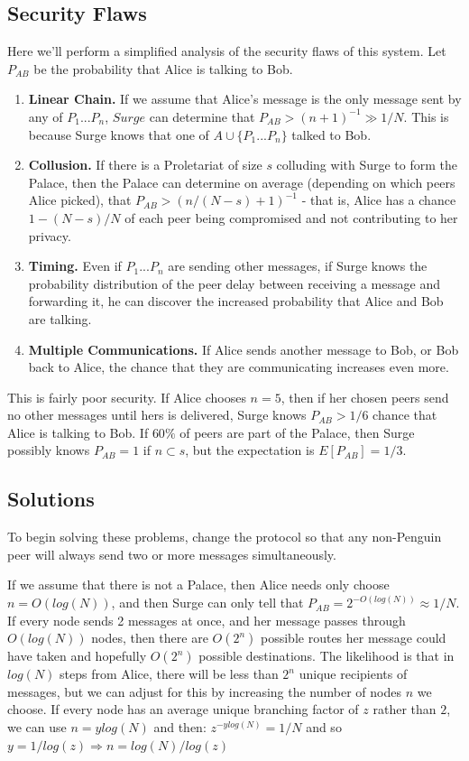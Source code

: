 \documentclass{paper}
\begin{document}
\subsection{Security Flaws}
Here we'll perform a simplified analysis of the security flaws of this system.
Let $P_{AB}$ be the probability that Alice is talking to Bob. 
\begin{enumerate}
\item\textbf{Linear Chain.} If we assume that Alice's message is the only message sent by any of $P_1 ... P_n$, $Surge$ can determine that $P_{AB} > (n+1)^{-1} \gg 1/N$. This is because Surge knows that one of $A \cup \{P_1 ... P_n\}$ talked to Bob.
\item\textbf{Collusion.} If there is a Proletariat of size $s$ colluding with Surge to form the Palace, then the Palace can determine on average (depending on which peers Alice picked), that $P_{AB} > (n/(N-s)+1)^{-1}$ - that is, Alice has a chance $1 - (N-s)/N$ of each peer being compromised and not contributing to her privacy.
\item\textbf{Timing.} Even if $P_1 ... P_n$ are sending other messages, if Surge knows the probability distribution of the peer delay between receiving a message and forwarding it, he can discover the increased probability that Alice and Bob are talking. 
\item\textbf{Multiple Communications.} If Alice sends another message to Bob, or Bob back to Alice, the chance that they are communicating increases even more. 
\end{enumerate}
This is fairly poor security. If Alice chooses $n = 5$, then if her chosen peers send no other messages until hers is delivered, Surge knows $P_{AB} > 1/6$ chance that Alice is talking to Bob. If $60\%$ of peers are part of the Palace, then Surge possibly knows $P_{AB} = 1$ if $n \subset s$, but the expectation is $E[P_{AB}] = 1/3$.

\subsection{Solutions}
To begin solving these problems, change the protocol so that any non-Penguin peer will always send two or more messages simultaneously.

If we assume that there is not a Palace, then Alice needs only choose $n = O(log(N))$, and then Surge can only tell that $P_{AB} = 2^{-O(log(N))} \approx 1/N $. If every node sends 2 messages at once, and her message passes through $O(log(N))$ nodes, then there are $O(2^n)$ possible routes her message could have taken and hopefully $O(2^n)$ possible destinations. The likelihood is that in $log(N)$ steps from Alice, there will be less than $2^n$ unique recipients of messages, but we can adjust for this by increasing the number of nodes $n$ we choose. If every node has an average unique branching factor of $z$ rather than $2$, we can use $n = y log(N)$ and then: $z^{-ylog(N)} = 1/N$ and so $y = 1/log(z) \Rightarrow n = log(N)/log(z)$
\end{document}
